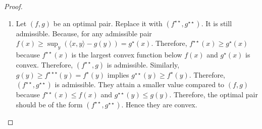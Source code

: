 \documentclass[10pt]{article}
\newcommand{\ud}{\,\mathrm{d}}
\newcommand{\op}[1]{\operatorname{#1}}
\newcommand{\calC}{\mathcal{C}}
\newcommand{\calF}{\mathcal{F}}
\newcommand{\calG}{\mathcal{G}}
\numberwithin{equation}{section}
\begin{document}
\begin{proof}
\begin{enumerate}
		For the other direction, assume $\pi$ is optimal for~\eqref{eq:primal-quad-constrained}. By assumption, there exists a minimizer $(f,g)$ for~\eqref{eq:dual-quad-constrained}. Then the gap is zero. 
		\begin{align*}
		\int \langle x, y\rangle \ud \pi(x,y) = \int f(x)\ud \mu(x) + \int g(y) \ud \nu(y) \geq \int (f(x)+g(y)) \ud \pi(x,y)
		\end{align*} 
		where the inequality follows because~$\pi \in \Pi_\preceq ([\mu]_\calF,[\nu]_\calG)$. Because of the constraint $(f,g)\in \overline{\calC}$ we have the inequality in other direction, 
		\begin{equation*}
		\int \langle x, y\rangle \ud \pi(x,y) \leq \int (f(x)+g(y)) \ud \pi(x,y)
		\end{equation*}
		Therefore, 
		\begin{align*}
		\int \langle x, y\rangle \ud \pi(x,y) = \int f(x)\ud \mu(x) + \int g(y) \ud \nu(y) = \int (f(x)+g(y)) \ud \pi(x,y)
		\end{align*} 
		and
		\begin{equation*}
		f(x) + g(y)=\langle x, y\rangle,\quad \forall(x,y)\in \op{supp}(\pi)
		\end{equation*}
		Because of the constraint $(f,g)\in \overline{\calC}$ we have $f(x)\geq \sup_{y} (\langle x, y\rangle - g(y))=g^\star(x)$. Therefore, $f(x)=g^\star(x)$ for all $x \in \op{supp}(\pi_x)$. Similarly, $g(y)=f^\star(y)$ for all $y \in \op{supp}(\pi_y)$. Finally the inequality $f(x)\geq f^{\star\star}(x)\geq g^\star(x)$ and the equality $f(x)=g^\star(x)$ for all $x \in\op{supp}(\pi_x)$ imply $f(x)=f^{\star\star}(x)=g^\star(x)$ for all $x \in \op{supp}(\pi_x)$. Similarly $ g(y)=g^{\star\star}(y)=f^\star(y)$ for all $y \in \op{supp}(\pi_y)$. Therefore
		\begin{equation*}
		f^{\star\star}(x) + g^{\star\star}(y)=\langle x, y\rangle,\quad \forall(x,y)\in \op{supp}(\pi)
		\end{equation*}
		It follows that $y \in \partial f^{\star\star}(x)$ and $x \in \partial g^{\star\star}(y)$ for all $(x,y)\in \op{supp}(\pi)$.	
		\item Let $(f,g)$ be an optimal pair. Replace it with $(f^{\star\star},g^{\star\star})$. It is still admissible. Because, for any admissible pair $f(x)\geq \sup_{y}(\langle x, y\rangle - g(y))=g^\star(x)$. Therefore, $f^{\star\star}(x)\geq g^\star(x)$ because $f^{\star\star}(x)$ is the largest convex function below $f(x)$ and $g^\star(x)$ is convex. Therefore, $(f^{\star\star},g)$ is admissible. Similarly, $g(y)\geq f^{\star\star\star}(y)=f^{\star}(y)$ implies $g^{\star\star}(y)\geq f^\star(y)$. Therefore, $(f^{\star\star},g^{\star\star})$ is admissible. They attain a smaller value compared to $(f,g)$ because $f^{\star\star}(x)\leq f(x)$ and $g^{\star\star}(y)\leq g(y)$. 	Therefore, the optimal pair should be of the form $(f^{\star\star},g^{\star\star})$. Hence they are convex.

\end{enumerate}
\end{proof}
\end{document}
